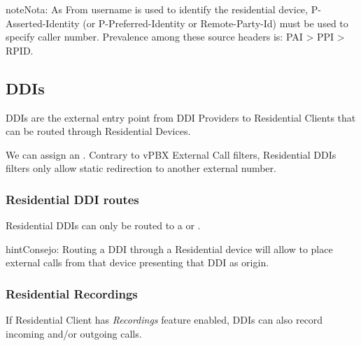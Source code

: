 \documentclass[letterpaper,10pt,spanish]{sphinxmanual}
\begin{document}
\begin{notice}{note}{Nota:}
As From username is used to identify the residential device, P-Asserted-Identity (or P-Preferred-Identity or Remote-Party-Id) must be used to specify caller number.
Prevalence among these source headers is: PAI \textgreater{} PPI \textgreater{} RPID.
\end{notice}


\subsection{DDIs}
\label{administration_portal/client/residential/ddis:ddis}\label{administration_portal/client/residential/ddis:residential-ddis}\label{administration_portal/client/residential/ddis::doc}
DDIs are the external entry point from DDI Providers to Residential Clients that
can be routed through Residential Devices.

We can assign an {\hyperref[administration_portal/client/vpbx/routing_tools/external_call_filters:external\string-call\string-filters]{}}. Contrary to vPBX External Call filters, Residential DDIs
filters only allow static redirection to another external number.


\subsubsection{Residential DDI routes}
\label{administration_portal/client/residential/ddis:residential-ddi-routes}
Residential DDIs can only be routed to a {\hyperref[administration_portal/client/residential/residential_devices:residential\string-devices]{}}
or {\hyperref[administration_portal/client/vpbx/faxes:faxing\string-system]{}}.

\begin{notice}{hint}{Consejo:}
Routing a DDI through a Residential device will allow to place external calls
from that device presenting that DDI as origin.
\end{notice}


\subsubsection{Residential Recordings}
\label{administration_portal/client/residential/ddis:residential-recordings}
If Residential Client has \emph{Recordings} feature enabled, DDIs can also record incoming and/or
outgoing calls.
\end{document}
